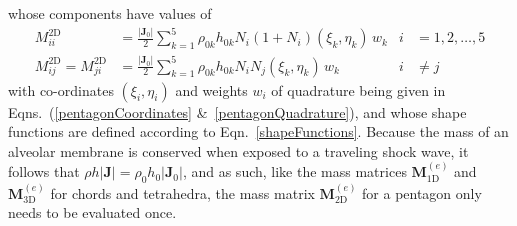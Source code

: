 whose components have values of
\begin{subequations}
    \begin{align}
    M_{ii}^{\mathrm{2D}} & = 
    \frac{| \mathbf{J}_0 |}{2} \sum_{k=1}^5 \rho_{0k} h_{0k} N_i ( 1 + 
    N_i ) ( \xi_k , \eta_k ) \, w_k & i & = 1,2,\ldots,5 \\
    M_{ij}^{\mathrm{2D}} = M_{ji}^{\mathrm{2D}} & =
    \frac{| \mathbf{J}_0 |}{2} \sum_{k=1}^5 \rho_{0k} h_{0k}
    N_i N_j (\xi_k , \eta_k ) \, w_k & i & \neq j
    \end{align}
\end{subequations}
with co-ordinates $( \xi_i , \eta_i )$ and weights $w_i$ of quadrature being given in Eqns.~(\ref{pentagonCoordinates} \&\ \ref{pentagonQuadrature}), and whose shape functions are defined according to Eqn.~\eqref{shapeFunctions}.  Because the mass of an alveolar membrane is conserved when exposed to a traveling shock wave, it follows that $\rho h | \mathbf{J} | = \rho_0 h_0 | \mathbf{J}_0 |$, and as such, like the mass matrices $\boldsymbol{M}^{(e)}_{\mathrm{1D}}$ and $\boldsymbol{M}^{(e)}_{\mathrm{3D}}$ for chords and tetrahedra, the mass matrix $\boldsymbol{M}^{(e)}_{\mathrm{2D}}$ for a pentagon only needs to be evaluated once. 

